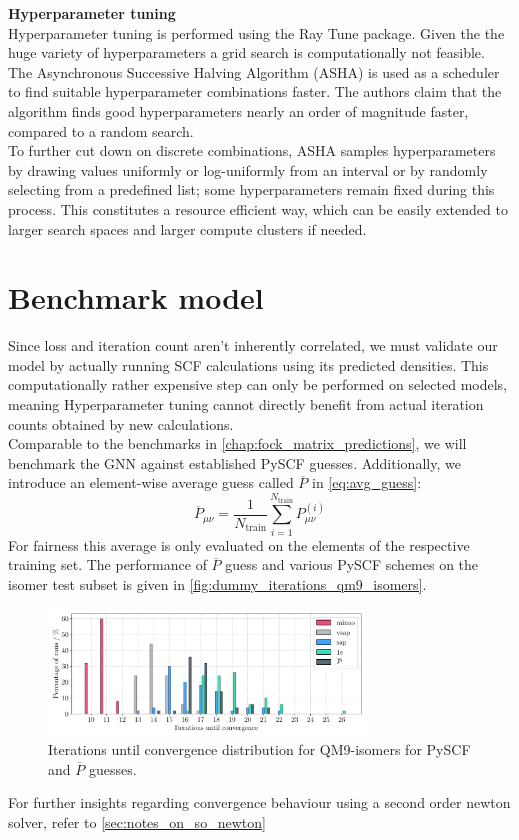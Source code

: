 \textbf{Hyperparameter tuning}\\
Hyperparameter tuning is performed using the Ray Tune \parencite{ref:ray_tune} package. Given the the huge variety of hyperparameters a grid search is computationally not feasible. The Asynchronous Successive Halving Algorithm (ASHA) is used as a scheduler to find suitable hyperparameter combinations faster. The authors claim that the algorithm finds good hyperparameters nearly an order of magnitude faster, compared to a random search. \parencite{ref:ASHA}\\
To further cut down on discrete combinations, ASHA samples hyperparameters by drawing values uniformly or log-uniformly from an interval or by randomly selecting from a predefined list; some hyperparameters remain fixed during this process. This constitutes a resource efficient way, which can be easily extended to larger search spaces and larger compute clusters if needed. 

\section{Benchmark model}
\label{sec:0_d_benchmark_model}
Since loss and iteration count aren't inherently correlated, we must validate our model by actually running SCF calculations using its predicted densities. This computationally rather expensive step can only be performed on selected models, meaning Hyperparameter tuning cannot directly benefit from actual iteration counts obtained by new calculations.\\
Comparable to the benchmarks in \autoref{chap:fock_matrix_predictions}, we will benchmark the GNN against established PySCF guesses. Additionally, we introduce an element-wise average guess called $\overline{P}$ in \autoref{eq:avg_guess}: 
\begin{equation}
    \label{eq:avg_guess}
    \overline{P}_{\mu\nu} = \frac{1}{N_\text{train}} \sum_{i=1}^{N_\text{train}} P^{(i)}_{\mu\nu}
\end{equation}
For fairness this average is only evaluated on the elements of the respective training set. The performance of $\overline{P}$ guess and various PySCF schemes on the  isomer test subset is given in \autoref{fig:dummy_iterations_qm9_isomers}. 
\begin{figure}[H]
    \centering
    \includegraphics[width=0.75\textwidth]{../fig/gnn/0_d_model_iteration_count_bar.pdf}
    \caption[Iterations until convergence distribution for QM9-isomers]{Iterations until convergence distribution for QM9-isomers for PySCF and $\overline{P}$ guesses.}
    \label{fig:dummy_iterations_qm9_isomers}
\end{figure}
For further insights regarding convergence behaviour using a second order newton solver, refer to \autoref{sec:notes_on_so_newton} 